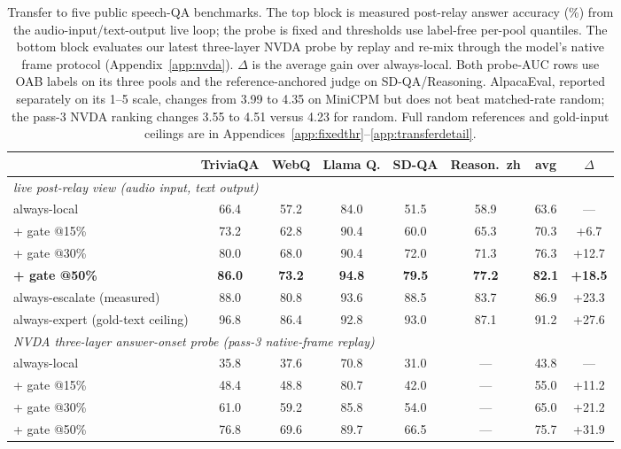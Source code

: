\begin{table}[t]
\centering\scriptsize
\setlength{\tabcolsep}{3.5pt}
\renewcommand{\arraystretch}{0.92}
\caption{Transfer to five public speech-QA benchmarks. The top block is
measured post-relay answer accuracy (\%) from the audio-input/text-output
live loop; the probe is fixed and thresholds use label-free per-pool
quantiles. The bottom block evaluates our latest three-layer NVDA
probe by replay and re-mix through the model's native frame protocol
(Appendix~\ref{app:nvda}). $\Delta$ is the average gain over always-local.
Both probe-AUC rows use OAB labels on its three pools and the
reference-anchored judge on SD-QA/Reasoning.
AlpacaEval, reported separately on its 1--5 scale, changes from 3.99
to 4.35 on MiniCPM but does not beat matched-rate random; the pass-3
NVDA ranking changes 3.55 to 4.51 versus 4.23 for random. Full random
references and gold-input ceilings are in
Appendices~\ref{app:fixedthr}--\ref{app:transferdetail}.}
\label{tab:transfer}
\begin{tabular}{lccccccc}
\toprule
& TriviaQA & WebQ & Llama Q. & SD-QA & Reason.\ zh & avg & $\Delta$ \\
\midrule
\multicolumn{8}{l}{\emph{live post-relay view (audio input, text output)}} \\
always-local          & 66.4 & 57.2 & 84.0 & 51.5 & 58.9 & 63.6 & --- \\
\;+ gate @15\%        & 73.2 & 62.8 & 90.4 & 60.0 & 65.3 & 70.3 & +6.7 \\
\;+ gate @30\%        & 80.0 & 68.0 & 90.4 & 72.0 & 71.3 & 76.3 & +12.7 \\
\;\textbf{+ gate @50\%} & \textbf{86.0} & \textbf{73.2} & \textbf{94.8} & \textbf{79.5} & \textbf{77.2} & \textbf{82.1} & \textbf{+18.5} \\
always-escalate (measured) & 88.0 & 80.8 & 93.6 & 88.5 & 83.7 & 86.9 & +23.3 \\
always-expert (gold-text ceiling) & 96.8 & 86.4 & 92.8 & 93.0 & 87.1 & 91.2 & +27.6 \\
\midrule
\multicolumn{8}{l}{\emph{NVDA three-layer answer-onset probe (pass-3 native-frame replay)}} \\
always-local          & 35.8 & 37.6 & 70.8 & 31.0 & --- & 43.8 & --- \\
\;+ gate @15\%        & 48.4 & 48.8 & 80.7 & 42.0 & --- & 55.0 & +11.2 \\
\;+ gate @30\%        & 61.0 & 59.2 & 85.8 & 54.0 & --- & 65.0 & +21.2 \\
\;+ gate @50\%        & 76.8 & 69.6 & 89.7 & 66.5 & --- & 75.7 & +31.9 \\

\end{tabular}
\end{table}
